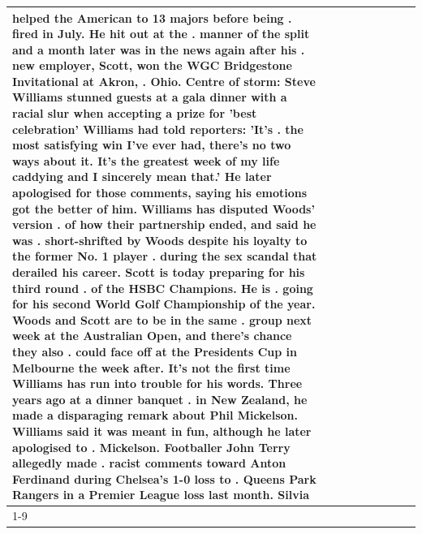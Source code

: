 \begin{table}[H]
\begin{tabular}{lllrlllll}
helped the American to 13 majors before being . fired in July. He hit out at the . manner of the split and a month later was in the news again after his . new employer, Scott, won the WGC Bridgestone Invitational at Akron, . Ohio. Centre of storm: Steve Williams stunned guests at a gala dinner with a racial slur when accepting a prize for 'best celebration' Williams had told reporters: 'It's . the most satisfying win I've ever had, there's no two ways about it. It's the greatest week of my life caddying and I sincerely mean that.' He later apologised for those comments, saying his emotions got the better of him. Williams has disputed Woods' version . of how their partnership ended, and said he was . short-shrifted by Woods despite his loyalty to the former No. 1 player . during the sex scandal that derailed his career. Scott is today preparing for his third round . of the HSBC Champions. He is . going for his second World Golf Championship of the year. Woods and Scott are to be in the same . group next week at the Australian Open, and there's chance they also . could face off at the Presidents Cup in Melbourne the week after. It's not the first time Williams has run into trouble for his words. Three years ago at a dinner banquet . in New Zealand, he made a disparaging remark about Phil Mickelson. Williams said it was meant in fun, although he later apologised to . Mickelson. Footballer John Terry allegedly made . racist comments toward Anton Ferdinand during Chelsea's 1-0 loss to . Queens Park Rangers in a Premier League loss last month. Silvia \\
\cline{1-9}

\end{tabular}
\end{table}

